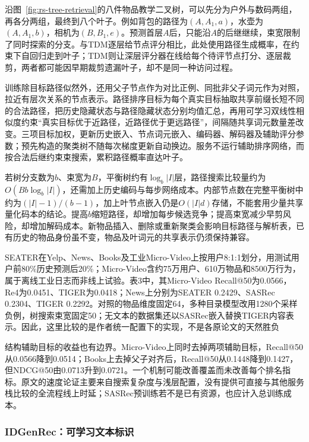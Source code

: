 沿图~\ref{fig:rs-tree-retrieval}的八件物品教学二叉树，可以先分为户外与数码两组，再各分两组，最终到八个叶子。例如背包的路径为$(A,A_1,a)$，水壶为$(A,A_1,b)$，相机为$(B,B_1,e)$。预测首层$A$后，只能沿$A$的后继继续，束宽限制了同时探索的分支。与TDM逐层给节点评分相比，此处使用路径生成概率，在约束下自回归走到叶子；TDM则让深层评分器在线给每个待评节点打分、逐层裁剪，两者都可能因早期裁剪遗漏叶子，却不是同一种访问过程。

训练除目标路径似然外，还用父子节点作为对比正例、同批非父子词元作为对照，拉近有层次关系的节点表示。路径排序目标为每个真实目标抽取共享前缀长短不同的合法路径，把历史隐藏状态与路径隐藏状态分别均值汇总，再用可学习双线性相似度约束“真实目标优于近路径，近路径优于更远路径”，间隔随共享词元数量差改变。三项目标加权，更新历史嵌入、节点词元嵌入、编码器、解码器及辅助评分参数；预先构造的聚类树不随每次梯度更新自动换边。服务不运行辅助排序网络，而按合法后继约束束搜索，累积路径概率直达叶子。

若树分支数为$b$、束宽为$B$，平衡树约有$\log_b|I|$层，路径搜索比较量约为$O(Bb\log_b|I|)$，还需加上历史编码与每步网络成本。内部节点数在完整平衡树中约为$(|I|-1)/(b-1)$，加上叶节点嵌入仍是$O(|I|d)$存储，不能套用少量共享量化码本的结论。提高$b$缩短路径，却增加每步候选竞争；提高束宽减少早剪风险，却增加解码成本。新物品插入、删除或重新聚类会影响目标路径与解析表，已有历史的物品身份虽不变，物品及叶词元的共享表示仍须保持兼容。

SEATER在Yelp、News、Books及工业Micro-Video上按用户8:1:1划分，用测试用户前80\%历史预测后20\%；Micro-Video含约75万用户、610万物品和8500万行为，属于离线工业日志而非线上试验。表3中，其Micro-Video Recall@50为0.0566，Re4为0.0451、TIGER为0.0418；News上分别为SEATER 0.2429、SASRec 0.2304、TIGER 0.2292。对照的物品维度固定64，多种目录模型改用1280个采样负例，树搜索束宽固定50；无文本的数据集还以SASRec嵌入替换TIGER内容表示。因此，这里比较的是作者统一配置下的实现，不是各原论文的天然胜负

结构辅助目标的收益也有边界。Micro-Video上同时去掉两项辅助目标，Recall@50从0.0566降到0.0514；Books上去掉父子对齐后，Recall@50从0.1448降到0.1427，但NDCG@50由0.0713升到0.0721。一个机制可能改善覆盖而未改善每个排名指标。原文的速度论证主要来自搜索复杂度与浅层配置，没有提供可直接与其他服务栈比较的全流程线上时延；SASRec预训练若不是已有资源，也应计入总训练成本。

\subsubsection{IDGenRec：可学习文本标识}
\label{sec:rs-idgenrec}

